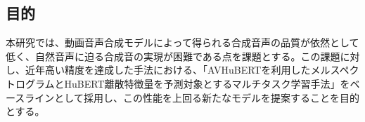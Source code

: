 \documentclass[12pt]{jarticle}
\numberwithin{equation}{section}    %
\numberwithin{figure}{section}      %
\numberwithin{table}{section}      %
\begin{document}

\subsection{目的}
本研究では、動画音声合成モデルによって得られる合成音声の品質が依然として低く、自然音声に迫る合成音の実現が困難である点を課題とする。この課題に対し、近年高い精度を達成した手法\cite{choi2023intelligible}における、「AVHuBERTを利用したメルスペクトログラムとHuBERT離散特徴量を予測対象とするマルチタスク学習手法」をベースラインとして採用し、この性能を上回る新たなモデルを提案することを目的とする。

\end{document}
